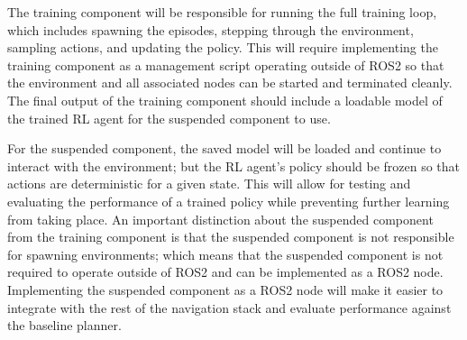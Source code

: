 \documentclass[conference]{IEEEtran}
\begin{document}
    The training component will be responsible for running the full training loop, which includes spawning the episodes, stepping through the environment, sampling actions, and updating the policy. This will require implementing the training component as a management script operating outside of ROS2 so that the environment and all associated nodes can be started and terminated cleanly. The final output of the training component should include a loadable model of the trained RL agent for the suspended component to use. 
    
    For the suspended component, the saved model will be loaded and continue to interact with the environment; but the RL agent's policy should be frozen so that actions are deterministic for a given state. This will allow for testing and evaluating the performance of a trained policy while preventing further learning from taking place. An important distinction about the suspended component from the training component is that the suspended component is not responsible for spawning environments; which means that the suspended component is not required to operate outside of ROS2 and can be implemented as a ROS2 node. Implementing the suspended component as a ROS2 node will make it easier to integrate with the rest of the navigation stack and evaluate performance against the baseline planner.
    
\end{document}
